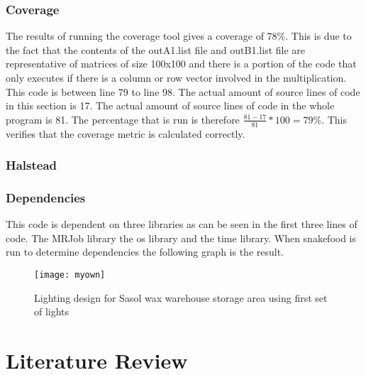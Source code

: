 \documentclass[11pt,journal, a4paper]{IEEEtran}
\begin{document}
\subsubsection{Coverage}
\noindent
The results of running the coverage tool gives a coverage of 78\%. This is due to the fact that the contents of the outA1.list file and outB1.list file are representative of matrices of size 100x100 and there is a portion of the code that only executes if there is a column or row vector involved in the multiplication. This code is between line 79 to line 98. The actual amount of source lines of code in this section is 17. The actual amount of source lines of code in the whole program is 81. The percentage that is run is therefore $\frac{81-17}{81}*100 = 79\% $. This verifies that the coverage metric is calculated correctly. 



\subsubsection{Halstead}



\subsubsection{Dependencies}
This code is dependent on three libraries as can be seen in the first three lines of code. The MRJob library the os library and the time library. When snakefood is run to determine dependencies the following graph is the result. 

 \begin{figure}[H]
 \centering 
 \texttt{[image: myown]}
 \centering 
  \caption {Lighting design for Sasol wax warehouse storage area using first set of lights }
 \end{figure}






\section{Literature Review}
\noindent






\end{document}
